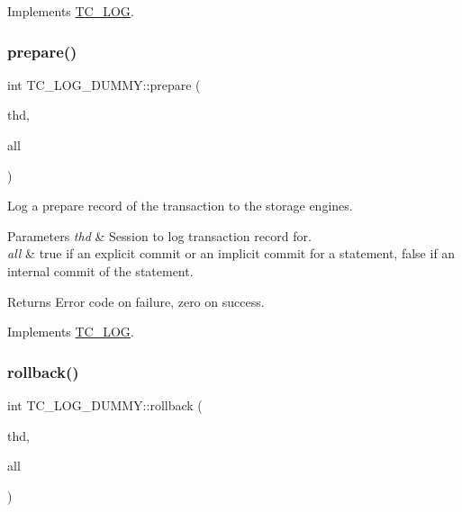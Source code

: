 Implements \mbox{\hyperlink{classTC__LOG_a34eb4c35fe8d29b0febbd700a61b282d}{T\+C\+\_\+\+L\+OG}}.

\mbox{\label{classTC__LOG__DUMMY_a911680c1d0a8f4e5a028e2f1920ee2a2}} 
\subsubsection{\texorpdfstring{prepare()}{prepare()}}
{\footnotesize\ttfamily int T\+C\+\_\+\+L\+O\+G\+\_\+\+D\+U\+M\+M\+Y\+::prepare (\begin{DoxyParamCaption}\item[{T\+HD $\ast$}]{thd,  }\item[{bool}]{all }\end{DoxyParamCaption})\hspace{0.3cm}{\ttfamily [virtual]}}

Log a prepare record of the transaction to the storage engines.


\begin{DoxyParams}{Parameters}
{\em thd} & Session to log transaction record for.\\
\hline
{\em all} & {\ttfamily true} if an explicit commit or an implicit commit for a statement, {\ttfamily false} if an internal commit of the statement.\\
\hline
\end{DoxyParams}
\begin{DoxyReturn}{Returns}
Error code on failure, zero on success. 
\end{DoxyReturn}


Implements \mbox{\hyperlink{classTC__LOG_ab968f1e200f370127c3dcd0302d00968}{T\+C\+\_\+\+L\+OG}}.

\mbox{\label{classTC__LOG__DUMMY_af37509e3086560c3d057a0c43b67a238}} 
\subsubsection{\texorpdfstring{rollback()}{rollback()}}
{\footnotesize\ttfamily int T\+C\+\_\+\+L\+O\+G\+\_\+\+D\+U\+M\+M\+Y\+::rollback (\begin{DoxyParamCaption}\item[{T\+HD $\ast$}]{thd,  }\item[{bool}]{all }\end{DoxyParamCaption})\hspace{0.3cm}{\ttfamily [virtual]}}

